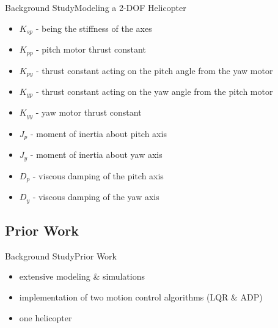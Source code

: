 \documentclass{beamer}
\begin{document}
\begin{frame}{Background Study}{Modeling a 2-DOF Helicopter}
\begin{itemize}
    \item $K_{sp}$ - being the stiffness of the axes
    \item $K_{pp}$ - pitch motor thrust constant
    \item $K_{py}$ - thrust constant acting on the pitch angle from the yaw motor
    \item $K_{yp}$ - thrust constant acting on the yaw angle from the pitch motor
    \item $K_{yy}$ - yaw motor thrust constant
    \item $J_p$ - moment of inertia about pitch axis
    \item $J_y$ - moment of inertia about yaw axis
    \item $D_p$ - viscous damping of the pitch axis
    \item $D_y$ - viscous damping of the yaw axis
\end{itemize}
\end{frame}



\subsection{Prior Work}

\begin{frame}{Background Study}{Prior Work}
  \begin{itemize}
      \item extensive modeling \& simulations
      \item implementation of two motion control algorithms (LQR \& ADP)
      \item one helicopter
  \end{itemize}
\end{frame}



  
\end{document}
